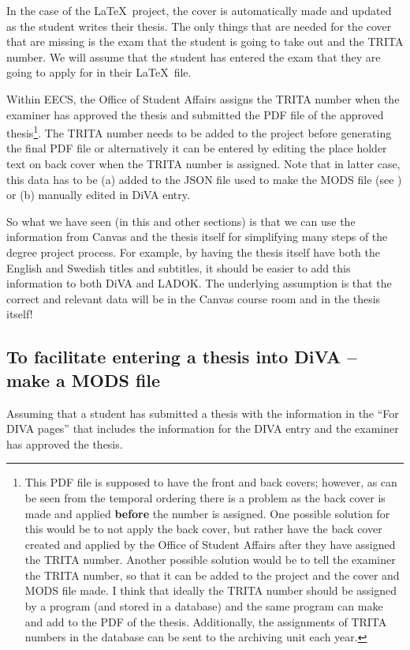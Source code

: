 In the case of the \LaTeX~project, the cover is automatically made and updated as the student writes their thesis. The only things that are needed for the cover that are missing is the exam that the student is going to take out and the TRITA number. We will assume that the student has entered the exam that they are going to apply for in their \LaTeX~file.

Within EECS, the Office of Student Affairs assigns the TRITA number when the examiner has approved the thesis and submitted the PDF file of the approved thesis\footnote{This PDF file is supposed to have the front and back covers; however, as can be seen from the temporal ordering there is a problem as the back cover is made and applied \textbf{before} the number is assigned. One possible solution for this would be to not apply the back cover, but rather have the back cover created and applied by the Office of Student Affairs after they have assigned the TRITA number. Another possible solution would be to tell the examiner the TRITA number, so that it can be added to the project and the cover and MODS file made. I think that ideally the TRITA number should be assigned by a program (and stored in a database) and the same program can make and add to the PDF of the thesis. Additionally, the assignments of TRITA numbers in the database can be sent to the archiving unit each year.}. The TRITA number needs to be \first added to the project before generating the final PDF file or \Second alternatively it can be entered by editing the place holder text on back cover when the TRITA number is assigned. Note that in latter case, this data has to be (a) added to the JSON file used to make the MODS file (see ) or (b) manually edited in DiVA entry.

So what we have seen (in this and other sections) is that we can use the information from Canvas and the thesis itself for simplifying many steps of the degree project process. For example, by having the thesis itself have both the English and Swedish titles and subtitles, it should be easier to add this information to both DiVA and LADOK. The underlying assumption is that the correct and relevant data will be in the Canvas course room and in the thesis itself!
\clearpage

\subsection{To facilitate entering a thesis into DiVA – make a MODS file}
\label{sec:facilitatingDiVAentry}
Assuming that a student has submitted a thesis with the information in the “For DIVA pages” that includes the information for the DIVA entry and the examiner has approved the thesis.


